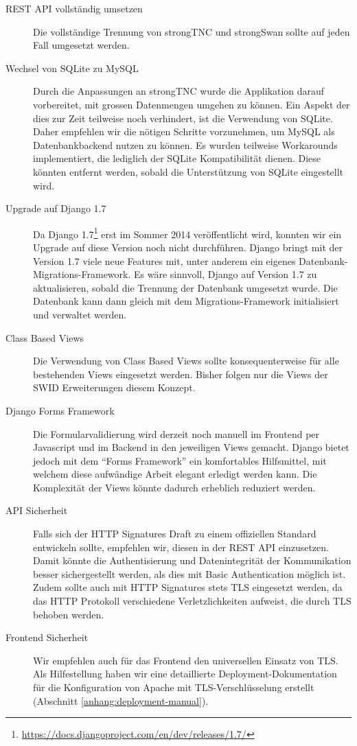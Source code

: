 \begin{description} 

	\item[REST API vollständig umsetzen] Die vollständige Trennung von strongTNC
	und strongSwan sollte auf jeden Fall umgesetzt werden.
	
	\item[Wechsel von SQLite zu MySQL] Durch die Anpassungen an strongTNC
	wurde die Applikation darauf vorbereitet, mit grossen Datenmengen umgehen zu
	können. Ein Aspekt der dies zur Zeit teilweise noch verhindert, ist die
	Verwendung von SQLite. Daher empfehlen wir die nötigen Schritte vorzunehmen, um
	MySQL als Datenbankbackend nutzen zu können. Es wurden teilweise Workarounds
	implementiert, die lediglich der SQLite Kompatibilität dienen. Diese könnten
	entfernt werden, sobald die Unterstützung von SQLite eingestellt wird.

	\item[Upgrade auf Django 1.7] Da Django
	1.7\footnote{\url{https://docs.djangoproject.com/en/dev/releases/1.7/}} erst
	im Sommer 2014 veröffentlicht wird, konnten wir ein Upgrade auf diese
	Version noch nicht durchführen. Django bringt mit der Version 1.7 viele neue
	Features mit, unter anderem ein eigenes Datenbank-Migrations-Framework. Es
	wäre sinnvoll, Django auf Version 1.7 zu aktualisieren, sobald die Trennung
	der Datenbank umgesetzt wurde. Die Datenbank kann dann gleich mit dem
	Migrations-Framework initialisiert und verwaltet werden.
	
	\item[Class Based Views] Die Verwendung von Class Based Views sollte
	konsequenterweise für alle bestehenden Views eingesetzt werden. Bisher folgen
	nur die Views der SWID Erweiterungen diesem Konzept.
	
	\item[Django Forms Framework] Die Formularvalidierung wird derzeit noch
		manuell im Frontend per Javascript und im Backend in den jeweiligen Views
		gemacht.  Django bietet jedoch mit dem \enquote{Forms Framework} ein
		komfortables Hilfsmittel, mit welchem diese aufwändige Arbeit elegant
		erledigt werden kann. Die Komplexität der Views könnte dadurch erheblich
		reduziert werden.
	
	\item[API Sicherheit] Falls sich der HTTP Signatures Draft zu einem
		offiziellen Standard entwickeln sollte, empfehlen wir, diesen in der REST API
		einzusetzen. Damit könnte die Authentisierung und Datenintegrität der
		Kommunikation besser sichergestellt werden, als dies mit Basic Authentication
		möglich ist.  Zudem sollte auch mit HTTP Signatures stets TLS eingesetzt
		werden, da das HTTP Protokoll verschiedene Verletzlichkeiten aufweist, die
		durch TLS behoben werden\cite{httpsecconsiderations2014}.
	
	\item[Frontend Sicherheit] Wir empfehlen auch für das Frontend den
		universellen Einsatz von TLS. Als Hilfestellung haben wir eine detaillierte
		Deployment-Dokumentation für die Konfiguration von Apache mit
		TLS-Verschlüsselung erstellt (Abschnitt \ref{anhang:deployment-manual}).
	
\end{description}

